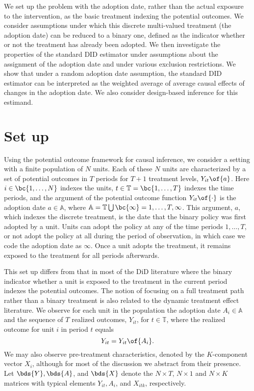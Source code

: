 \documentclass[12pt]{article}
\theoremstyle{definition}
\begin{document}
We set up the problem with the adoption date, rather than the actual exposure to the intervention, as the basic treatment indexing the potential outcomes. We consider assumptions under which this discrete multi-valued treatment (the adoption date) can be reduced to a binary one, defined as the indicator whether or not the treatment has already been adopted. We then investigate the properties of the standard DID estimator under assumptions about the assignment of the adoption date and under various exclusion restrictions. We show that under a random adoption date assumption, the standard DID estimator can be interpreted as the weighted average of average causal effects of changes in the adoption date. We also consider design-based inference for this estimand.

\section{Set up}

Using the potential outcome framework for causal inference, we consider a setting with a finite population of $N$ units. Each of these $N$ units are characterized by a set of potential outcomes in $T$ periods for $T+1$ treatment levels, $Y_{it}\of{a}$. Here $i \in \bc{1, \ldots, N}$ indexes the units, $t \in \mathbb{T} = \bc{1, \ldots, T}$ indexes the time periods, and the argument of the potential outcome function $Y_{it}\of{\cdot}$ is the adoption date $a \in \mathbb{A}$, where $\mathbb{A} = \mathbb{T} \bigcup \bc{\infty} = {1, \ldots, T, \infty}$. This argument, $a$, which indexes the discrete treatment, is the date that the binary policy was first adopted by a unit. Units can adopt the policy at any of the time periods $1, \ldots, T$, or not adopt the policy at all during the period of observation, in which case we code the adoption date as $\infty$. Once a unit adopts the treatment, it remains exposed to the treatment for all periods afterwards.

This set up differs from that in most of the DiD literature where the binary indicator whether a unit is exposed to the treatment in the current period indexes the potential outcomes. The notion of focusing on a full treatment path rather than a binary treatment is also related to the dynamic treatment effect literature. We observe for each unit in the population the adoption date $A_i \in \mathbb{A}$ and the sequence of $T$ realized outcomes, $Y_{it}$, for $t \in \mathbb{T}$, where the realized outcome for unit $i$ in period $t$ equals 
\begin{equation}
    \label{2_1}
    Y_{it} = Y_{it}\of{A_i}.
\end{equation}
We may also observe pre-treatment characteristics, denoted by the $K$-component vector $X_i$, although for most of the discussion we abstract from their presence. Let $\bds{Y}, \bds{A}$, and $\bds{X}$ denote the $N \times T$, $N \times 1$ and $N \times K$ matrices with typical elements $Y_{it}, A_{i}$, and $X_{itk}$, respectively.
\end{document}
